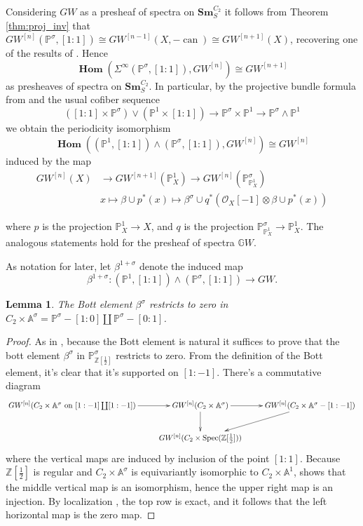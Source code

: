 \documentclass[edeposit,fullpage]{uiucthesis2009}
\newcommand{\Z}{\mathbb Z}
\newcommand{\mbb}{\mathbb}
\newcommand{\mc}{\mathcal}
\newcommand{\Sm}[1]{\mathbf{Sm}_{#1}}
\DeclareMathOperator{\Spec}{Spec}
\DeclareMathOperator{\can}{can}
\DeclareMathOperator{\iHom}{\mathbf{Hom}}
\theoremstyle{plain}
\newtheorem{lemma}{Lemma}
\numberwithin{lemma}{section}
\theoremstyle{definition}
\begin{document}
Considering $GW$ as a presheaf of spectra on $\Sm{S}^{C_2}$ it follows from
Theorem \ref{thm:proj_inv} that $GW^{[n]}(\mbb P^\sigma,[1:1]) \cong
GW^{[n-1]}(X,-\can) \cong GW^{[n+1]}(X)$, recovering one of the results of
  \cite{Xie2018ATM}. Hence
\[
\iHom(\Sigma^\infty (\mbb P^\sigma,[1:1]),GW^{[n]}) \cong
GW^{[n+1]}
\]
as presheaves of spectra on $\Sm{S}^{C_2}$. In particular, by the
projective bundle formula from \cite{Schder} and the usual cofiber
sequence 
\[
([1:1] \times \mbb P^\sigma) \vee (\mbb P^1 \times [1:1]) \rightarrow
\mbb P^\sigma \times \mbb P^1 \rightarrow \mbb P^\sigma \wedge \mbb P^1
\]
we obtain the periodicity isomorphism  
\[
\iHom((\mbb P^1,[1:1]) \wedge (\mbb P^\sigma,[1:1]),GW^{[n]}) \cong
GW^{[n]}
\]
induced by the map 
\begin{align*}
GW^{[n]}(X) &\rightarrow GW^{[n+1]}(\mbb P^1_X) \rightarrow
              GW^{[n]}(\mbb P^\sigma_{\mbb P^1_X})\\
& x \mapsto \beta \cup p^*(x) \mapsto \beta^\sigma \cup q^*(\mc O_X[-1]
  \otimes \beta \cup p^*(x))
\end{align*}

where $p$ is the projection $\mbb P^1_X \rightarrow X$, and $q$ is the
projection $\mbb P^\sigma_{\mbb P^1_X} \rightarrow \mbb P^1_X$. The
analogous statements hold for the presheaf of spectra $\mbb GW$.

As notation for later, let $\beta^{1+\sigma}$ denote the induced map
\begin{equation}\label{eq:bott_element}
\beta^{1+\sigma} : (\mbb P^1,[1:1]) \wedge (\mbb P^\sigma,[1:1])
\rightarrow GW.
\end{equation}

\begin{lemma}\label{lem:bott_zero}
The Bott element $\beta^\sigma$ restricts to zero in $C_2 \times \mbb
A^\sigma = \mbb P^{\sigma} - [1:0] \coprod \mbb P^\sigma - [0:1]$. 
\end{lemma}

\begin{proof}
As in \cite{Schder}, because the Bott element is natural it suffices
to prove that the bott element $\beta^\sigma$ in $\mbb
P^\sigma_{\Z[\frac{1}{2}]}$ restricts to zero. From the definition of
the Bott element, it's clear that it's supported on $[1:-1]$. There's a commutative diagram
\[
\xymatrix{GW^{[n]}(C_2 \times \mbb A^\sigma \text{ on } [1:-1] \coprod
[1:-1]) \ar[r] & GW^{[n]}(C_2 \times \mbb A^\sigma) \ar[r]\ar[d] &
GW^{[n]}(C_2 \times \mbb A^\sigma - [1:-1]) \ar[dl] \\ &
GW^{[n]}(C_2 \times \Spec(\Z[\frac{1}{2}])) &
} 
\]
where the vertical maps are induced by inclusion of the point
$[1:1]$. Because $\Z[\frac{1}{2}]$ is regular and $C_2 \times
\mbb A^\sigma$ is equivariantly isomorphic to $C_2 \times \mbb A^1$, 
\cite[Theorem 7.5]{Xie2018ATM} shows that the middle vertical map is an isomorphism,
hence the upper right map is an injection. By localization
\cite[Theorem 6.6]{Schder}, the top
row is exact, and it follows that the left horizontal map is the zero
map. 
\end{proof}
\end{document}
